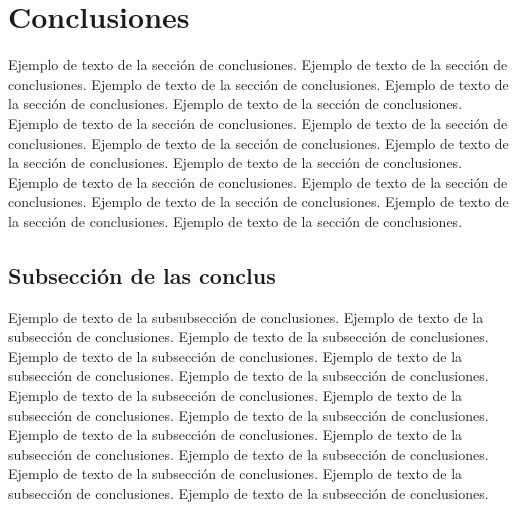 \section{Conclusiones}

Ejemplo de texto de la sección de conclusiones. Ejemplo de texto de la sección de conclusiones. Ejemplo de texto de la sección de conclusiones. Ejemplo de texto de la sección de conclusiones. Ejemplo de texto de la sección de conclusiones. Ejemplo de texto de la sección de conclusiones. Ejemplo de texto de la sección de conclusiones. Ejemplo de texto de la sección de conclusiones. Ejemplo de texto de la sección de conclusiones. Ejemplo de texto de la sección de conclusiones. Ejemplo de texto de la sección de conclusiones. Ejemplo de texto de la sección de conclusiones. Ejemplo de texto de la sección de conclusiones. Ejemplo de texto de la sección de conclusiones. Ejemplo de texto de la sección de conclusiones. 

\subsection{Subsección de las conclus}

Ejemplo de texto de la subsubsección de conclusiones. Ejemplo de texto de la subsección de conclusiones. Ejemplo de texto de la subsección de conclusiones. Ejemplo de texto de la subsección de conclusiones. Ejemplo de texto de la subsección de conclusiones. Ejemplo de texto de la subsección de conclusiones. Ejemplo de texto de la subsección de conclusiones. Ejemplo de texto de la subsección de conclusiones. Ejemplo de texto de la subsección de conclusiones. Ejemplo de texto de la subsección de conclusiones. Ejemplo de texto de la subsección de conclusiones. Ejemplo de texto de la subsección de conclusiones. Ejemplo de texto de la subsección de conclusiones. Ejemplo de texto de la subsección de conclusiones. Ejemplo de texto de la subsección de conclusiones. 
